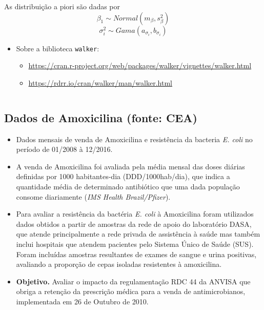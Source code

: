 \documentclass[
]{book}
\providecommand{\tightlist}{%
  \setlength{\itemsep}{0pt}\setlength{\parskip}{0pt}}
\begin{document}
As distribuição a piori são dadas por
\[\beta_1 \sim \textit{Normal}(m_\beta,{s}_\beta^2)\]
\[\sigma_i^2 \sim \textit{Gama}({a}_{\sigma_i},{b}_{\sigma_i})\]

\begin{itemize}
\tightlist
\item
  Sobre a biblioteca \texttt{walker}:

  \begin{itemize}
  \tightlist
  \item
    \url{https://cran.r-project.org/web/packages/walker/vignettes/walker.html}
  \item
    \url{https://rdrr.io/cran/walker/man/walker.html}
  \end{itemize}
\end{itemize}

\(~\)

\hypertarget{dados-de-amoxicilina-fonte-cea}{%
\subsection{Dados de Amoxicilina (fonte: CEA)}\label{dados-de-amoxicilina-fonte-cea}}

\begin{itemize}
\item
  Dados mensais de venda de Amoxicilina e resistência da bacteria \emph{E. coli} no período de 01/2008 à 12/2016.
\item
  A venda de Amoxicilina foi avaliada pela média mensal das doses diárias definidas por 1000 habitantes-dia (DDD/1000hab/dia), que indica a quantidade média de determinado antibiótico que uma dada população consome diariamente (\emph{IMS Health Brazil/Pfizer}).
\item
  Para avaliar a resistência da bactéria \emph{E. coli} à Amoxicilina foram utilizados dados obtidos a partir de amostras da rede de apoio do laboratório DASA, que atende principalmente a rede privada de assistência à saúde mas também inclui hospitais que atendem pacientes pelo Sistema Único de Saúde (SUS). Foram
  incluídas amostras resultantes de exames de sangue e urina positivas, avaliando a proporção de cepas isoladas resistentes à amoxicilina.
\item
  \textbf{Objetivo.} Avaliar o impacto da regulamentação RDC 44 da ANVISA que
  obriga a retenção da prescrição médica para a venda de antimicrobianos, implementada em 26 de Outubro de 2010.
\end{itemize}
\end{document}
